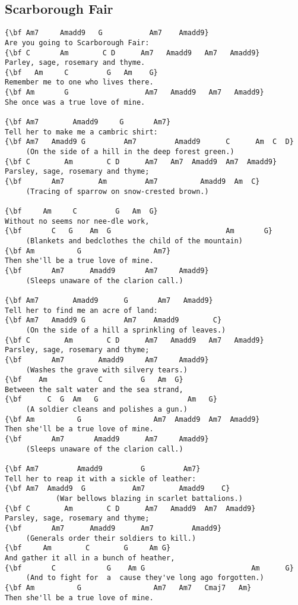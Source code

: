 \documentclass[a4paper]{article}
\begin{document}
\subsection{Scarborough Fair} %
\label{sub:Scarborough Fair}
\begin{Verbatim}[commandchars=\\\{\}]
{\bf Am7     Amadd9   G           Am7    Amadd9}
Are you going to Scarborough Fair:
{\bf C       Am        C D      Am7   Amadd9   Am7   Amadd9}
Parley, sage, rosemary and thyme.
{\bf   Am     C         G   Am    G}
Remember me to one who lives there.
{\bf Am       G                  Am7   Amadd9   Am7   Amadd9}
She once was a true love of mine.

{\bf Am7        Amadd9     G       Am7}
Tell her to make me a cambric shirt:
{\bf Am7   Amadd9 G         Am7         Amadd9      C      Am  C  D}
     (On the side of a hill in the deep forest green.)
{\bf C        Am        C D      Am7   Am7  Amadd9  Am7  Amadd9}
Parsley, sage, rosemary and thyme;
{\bf       Am7        Am         Am7          Amadd9  Am  C}
     (Tracing of sparrow on snow-crested brown.)

{\bf     Am     C         G   Am  G}
Without no seems nor nee-dle work,
{\bf       C   G    Am  G                           Am       G}
     (Blankets and bedclothes the child of the mountain)
{\bf Am          G                 Am7}
Then she'll be a true love of mine.
{\bf       Am7      Amadd9       Am7     Amadd9}
     (Sleeps unaware of the clarion call.)

{\bf Am7        Amadd9      G       Am7   Amadd9}
Tell her to find me an acre of land:
{\bf Am7   Amadd9 G         Am7    Amadd9        C}
     (On the side of a hill a sprinkling of leaves.)
{\bf C        Am        C D      Am7   Amadd9   Am7   Amadd9}
Parsley, sage, rosemary and thyme;
{\bf       Am7        Amadd9     Am7     Amadd9}
     (Washes the grave with silvery tears.)
{\bf    Am            C         G   Am  G}
Between the salt water and the sea strand,
{\bf      C  G  Am   G                     Am   G}
     (A soldier cleans and polishes a gun.)
{\bf Am          G                 Am7  Amadd9  Am7  Amadd9}
Then she'll be a true love of mine.
{\bf       Am7       Amadd9      Am7     Amadd9}
     (Sleeps unaware of the clarion call.)

{\bf Am7         Amadd9         G         Am7}
Tell her to reap it with a sickle of leather:
{\bf Am7  Amadd9  G           Am7        Amadd9    C}
            (War bellows blazing in scarlet battalions.)
{\bf C        Am        C D      Am7   Amadd9  Am7  Amadd9}
Parsley, sage, rosemary and thyme;
{\bf       Am7      Amadd9      Am7         Amadd9}
     (Generals order their soldiers to kill.)
{\bf     Am        C        G     Am G}
And gather it all in a bunch of heather,
{\bf       C            G    Am G                         Am      G}
     (And to fight for  a  cause they've long ago forgotten.)
{\bf Am          G                 Am7   Am7   Cmaj7   Am}
Then she'll be a true love of mine. 
\end{Verbatim}
\newpage
\end{document}
